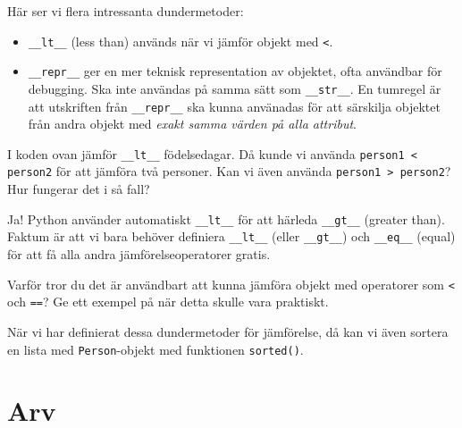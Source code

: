 Här ser vi flera intressanta dundermetoder:
\begin{itemize}
  \item \texttt{__lt__} (\foreignlanguage{english}{less than}) används 
  när vi jämför objekt med \texttt{<}.
  \item \texttt{__repr__} ger en mer teknisk representation av 
    objektet, ofta användbar för debugging.
    Ska inte användas på samma sätt som \texttt{__str__}.
    En tumregel är att utskriften från \texttt{__repr__} ska kunna 
    använadas för att särskilja objektet från andra objekt med \emph{exakt 
    samma värden på alla attribut}.
\end{itemize}

\begin{exercise}
  I koden ovan jämför \texttt{__lt__} födelsedagar.
  Då kunde vi använda \texttt{person1 < person2} för att jämföra 
  två personer.
  Kan vi även använda \texttt{person1 > person2}?
  Hur fungerar det i så fall?
\end{exercise}

Ja! Python använder automatiskt \texttt{__lt__} för att härleda 
\texttt{__gt__} (\foreignlanguage{english}{greater than}).
Faktum är att vi bara behöver definiera \texttt{__lt__}
(eller \texttt{__gt__})
och \texttt{__eq__} (\foreignlanguage{english}{equal}) för att få alla 
andra jämförelseoperatorer gratis.

\begin{exercise}
  Varför tror du det är användbart att kunna jämföra objekt med 
  operatorer som \texttt{<} och \texttt{==}?
  Ge ett exempel på när detta skulle vara praktiskt.
\end{exercise}

När vi har definierat dessa dundermetoder för jämförelse, då kan vi även 
sortera en lista med \texttt{Person}-objekt med funktionen
\texttt{sorted()}.


\section{Arv}

